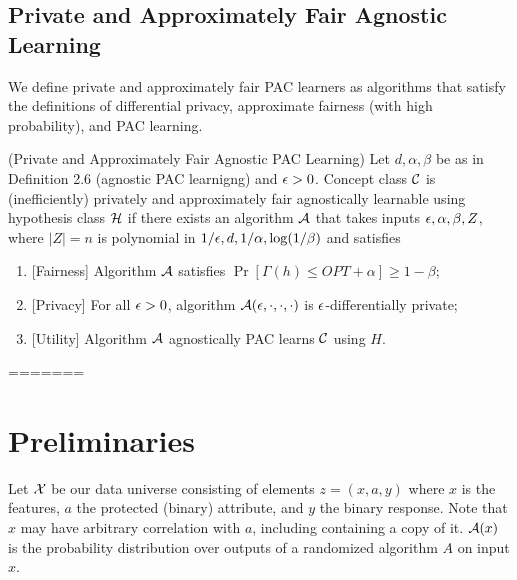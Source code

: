\subsection{Private and Approximately Fair Agnostic Learning}
We define private and approximately fair PAC learners as algorithms that satisfy the definitions of differential privacy, approximate fairness (with high probability), and PAC learning.
\begin{defn}
	(Private and Approximately Fair Agnostic PAC Learning)
	Let $d, \alpha, \beta$ be as in Definition 2.6 (agnostic PAC
  learnigng) and $\epsilon > 0$. Concept class $\mathcal{C}$ is (inefficiently)
  privately and approximately fair agnostically learnable using
  hypothesis class $\mathcal{H}$ if there exists an algorithm $\mathcal{A}$ that takes
  inputs $\epsilon, \alpha, \beta, Z$, where $|Z|=n$ is polynomial in
  $1/\epsilon, d, 1/\alpha, \log(1/\beta)$ and satisfies
	\begin{enumerate}
		\item {[}Fairness{]} Algorithm $\mathcal{A}$ satisfies $\Pr[\Gamma(h) \leq
    OPT + \alpha] \geq 1-\beta$;
		\item {[}Privacy{]} For all $\epsilon>0$, algorithm $\mathcal{A}(\epsilon, \cdot, \cdot, \cdot)$ is $\epsilon$-differentially private;
		\item {[}Utility{]} Algorithm $\mathcal{A}$ agnostically PAC learns $\mathcal{C}$ using $H$.
	\end{enumerate}
\end{defn}
=======

\section{Preliminaries}
Let $\mathcal{X}$ be our data universe consisting of elements $z=(x,a,y)$
 where $x$ is the features, $a$ the protected (binary) attribute, and
 $y$ the binary response. Note that $x$ may have arbitrary correlation
 with $a$, including containing a copy of it. $\mathcal{A}(x)$ is the
 probability distribution over outputs of a randomized algorithm $A$ on
 input $x$.




